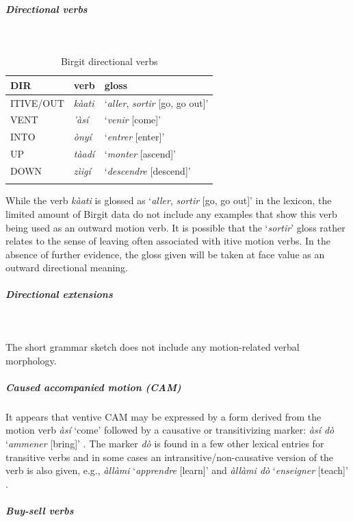\newpage
\subparagraph{Directional verbs}~

\begin{table}[H]
	\caption{Birgit directional verbs} 
	\label{tab:birgV}
	\begin{tabular}{lll} %
		\lsptoprule
		DIR & verb & gloss   \\ %
		\midrule
		ITIVE/OUT & \textit{kàati} & `\textit{aller}, \textit{sortir} [go, go out]' \\
		VENT & \textit{'àsí} & `\textit{venir} [come]' \\
		INTO& \textit{ònyí} & `\textit{entrer} [enter]' \\
		UP & \textit{tàadí} & `\textit{monter} [ascend]' \\
		DOWN & \textit{zìigí} & `\textit{descendre} [descend]' \\
		\lspbottomrule
	\end{tabular}
\end{table}

While the verb \textit{kàati} is glossed as `\textit{aller}, \textit{sortir} [go, go out]' in the lexicon, the limited amount of Birgit data do not include any examples that show this verb being used as an outward motion verb. It is possible that the `\textit{sortir}' gloss rather relates to the sense of leaving often associated with itive motion verbs. In the absence of further evidence, the gloss given will be taken at face value as an outward directional meaning. 

\subparagraph{Directional extensions}~

The short grammar sketch does not include any motion-related verbal morphology. 

\subparagraph{Caused accompanied motion (CAM)}

It appears that ventive CAM may be expressed by a form derived from the motion verb \textit{àsí} `come' followed by a causative or transitivizing marker: \textit{àsí dò} `\textit{ammener} [bring]' \citep[351]{jungraithmayrBirgitOsttschadischeSprache2004}. The marker \textit{dò} is found in a few other lexical entries for transitive verbs and in some cases an intransitive/non-causative version of the verb is also given, e.g., \textit{àllàmi} `\textit{apprendre} [learn]' and \textit{àllàmi dò} `\textit{enseigner} [teach]' \citep[350]{jungraithmayrBirgitOsttschadischeSprache2004}.

\subparagraph{Buy-sell verbs}

